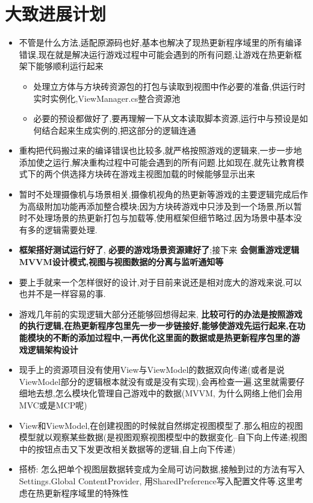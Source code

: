 \documentclass[9pt, b5paper]{article}
\begin{document}
\section{大致进展计划}
\label{sec-3}
\begin{itemize}
\item 不管是什么方法,适配原源码也好,基本也解决了现热更新程序域里的所有编译错误,现在就是解决运行游戏过程中可能会遇到的所有问题,让游戏在热更新框架下能够顺利运行起来
\begin{itemize}
\item 处理立方体与方块砖资源包的打包与读取到视图中作必要的准备,供运行时实时实例化,ViewManager.cs整合资源池
\item 必要的预设都做好了,要再理解一下从文本读取脚本资源,运行中与预设是如何结合起来生成实例的,把这部分的逻辑连通
\end{itemize}
\item 重构把代码搬过来的编译错误也比较多,就严格按照游戏的逻辑来,一步一步地添加使之运行,解决重构过程中可能会遇到的所有问题.比如现在,就先让教育模式下的两个供选择方块砖在游戏主视图加载的时候能够显示出来
\item 暂时不处理摄像机与场景相关,摄像机视角的热更新等游戏的主要逻辑完成后作为高级附加功能再添加整合模块;因为方块砖游戏中只涉及到一个场景,所以暂时不处理场景的热更新打包与加载等,使用框架但细节略过,因为场景中基本没有多的逻辑需要处理.
\item \textbf{框架搭好测试运行好了}, \textbf{必要的游戏场景资源建好了};接下来 \textbf{会侧重游戏逻辑MVVM设计模式,视图与视图数据的分离与监听通知等}
\item 要上手就来一个怎样很好的设计,对于目前来说还是相对庞大的游戏来说,可以也并不是一样容易的事.
\item 游戏几年前的实现逻辑大部分还能够回想得起来, \textbf{比较可行的办法是按照游戏的执行逻辑,在热更新程序包里先一步一步链接好,能够使游戏先运行起来,在功能模块的不断的添加过程中,一再优化这里面的数据或是热更新程序包里的游戏逻辑架构设计}
\item 现手上的资源项目没有使用View与ViewModel的数据双向传递(或者是说ViewModel部分的逻辑根本就没有或是没有实现),会再检查一遍.这里就需要仔细地去想,怎么模块化管理自己游戏中的数据(MVVM, 为什么网络上他们会用MVC或是MCP呢)
\item View和ViewModel,在创建视图的时候就自然绑定视图模型了.那么相应的视图模型就以观察某些数据(是视图观察视图模型中的数据变化--自下向上传递;视图中的按钮点击又下发更改相关数据等的逻辑,自上向下传递)
\item 搭桥: 怎么把单个视图层数据转变成为全局可访问数据,接触到过的方法有写入Settings.Global ContentProvider, 用SharedPreference写入配置文件等.这里考虑在热更新程序域里的特殊性

\end{itemize}
\end{document}
